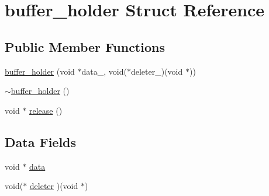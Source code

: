\hypertarget{structbuffer__holder}{\section{buffer\-\_\-holder Struct Reference}
\label{structbuffer__holder}
}
\subsection*{Public Member Functions}
\begin{DoxyCompactItemize}
\item 
\hyperlink{structbuffer__holder_aec91ad4dabc8db2a6cacac601b317857}{buffer\-\_\-holder} (void $\ast$data\-\_\-, void($\ast$deleter\-\_\-)(void $\ast$))
\item 
\hyperlink{structbuffer__holder_a43e10af0ca501bfa9bd1c2a012937876}{$\sim$buffer\-\_\-holder} ()
\item 
void $\ast$ \hyperlink{structbuffer__holder_add9b75027bdf15dee0e2dc88225d5b10}{release} ()
\end{DoxyCompactItemize}
\subsection*{Data Fields}
\begin{DoxyCompactItemize}
\item 
void $\ast$ \hyperlink{structbuffer__holder_a06c1e1004fac90848dfdb4fbc150cede}{data}
\item 
void($\ast$ \hyperlink{structbuffer__holder_a96e7067c68bc1f7a9ee7dd75c84f04e8}{deleter} )(void $\ast$)
\end{DoxyCompactItemize}



